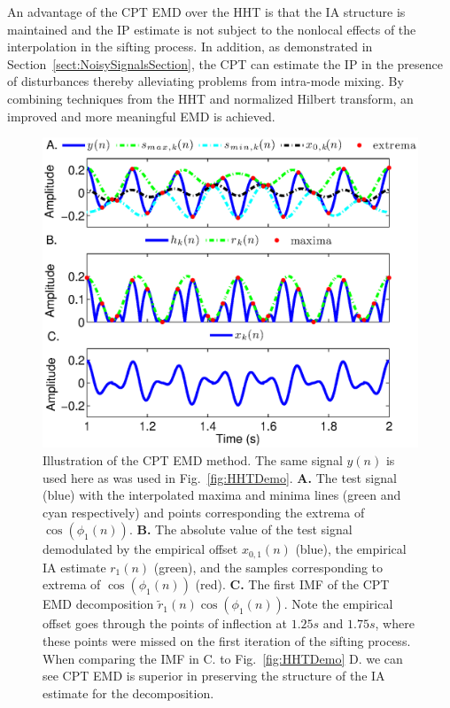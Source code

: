 \documentclass[a4paper]{IEEEtran}
\begin{document}
An advantage of the CPT EMD over the HHT is that the IA structure is maintained and the IP estimate is not subject to the nonlocal effects of the interpolation in the sifting process. In addition, as demonstrated in Section~\ref{sect:NoisySignalsSection}, the CPT can estimate the IP in the presence of disturbances thereby alleviating problems from intra-mode mixing. By combining techniques from the HHT and normalized Hilbert transform, an improved and more meaningful EMD is achieved. %
% 
\begin{figure}
\centering
\includegraphics[scale=0.42]{./Figures/CPT_EMD_demo.eps}
\caption[CPT_EMD]{Illustration of the CPT EMD method. The same signal $y(n)$ is used here as was used in Fig.~\ref{fig:HHTDemo}. \textbf{A.} The test signal (blue) with the interpolated maxima and minima lines (green and cyan respectively) and points corresponding the extrema of $\cos\left(\phi_1(n)\right)$. \textbf{B.} The absolute value of the test signal demodulated by the empirical offset $x_{0,1}(n)$ (blue), the empirical IA estimate $r_{1}(n)$ (green), and the samples corresponding to extrema of $\cos\left(\phi_1\left(n\right)\right)$ (red). \textbf{C.} The first IMF of the CPT EMD decomposition $\tilde{r}_1(n)\cos\left(\phi_1\left(n\right)\right)$. Note the empirical offset goes through the points of inflection at $1.25 s$ and $1.75s$, where these points were missed on the first iteration of the sifting process. When comparing the IMF in C. to Fig.~\ref{fig:HHTDemo} D. we can see CPT EMD is superior in preserving the structure of the IA estimate for the decomposition.}
\label{CPT_EMD}
\end{figure}
\end{document}
